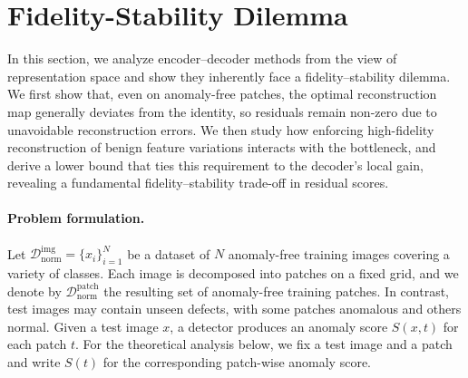 \documentclass{article}
\theoremstyle{plain}
\theoremstyle{definition}
\theoremstyle{remark}
\begin{document}
\section{Fidelity-Stability Dilemma}
\label{sec:theory}


In this section, we analyze encoder–decoder methods from the view of representation space and show they inherently face a fidelity–stability dilemma. We first show that, even on anomaly-free patches, the optimal reconstruction map generally deviates from the identity, so residuals remain non-zero due to unavoidable reconstruction errors. We then study how enforcing high-fidelity reconstruction of benign feature variations interacts with the bottleneck, and derive a lower bound that ties this requirement to the decoder’s local gain, revealing a fundamental fidelity–stability trade-off in residual scores.



\paragraph{Problem formulation.}
Let $\mathcal{D}_{\mathrm{norm}}^{\mathrm{img}} = \{x_i\}_{i=1}^N$ be a dataset of $N$ anomaly-free training images covering a variety of classes. Each image is decomposed into patches on a fixed grid, and we denote by $\mathcal{D}_{\mathrm{norm}}^{\mathrm{patch}}$ the resulting set of anomaly-free training patches.
In contrast, test images may contain unseen defects, with some patches anomalous and others normal.
Given a test image $x$, a detector produces an anomaly score $S(x,t)$ for each patch $t$.
For the theoretical analysis below, we fix a test image and a patch and write $S(t)$ for the corresponding patch-wise anomaly score.
\end{document}
